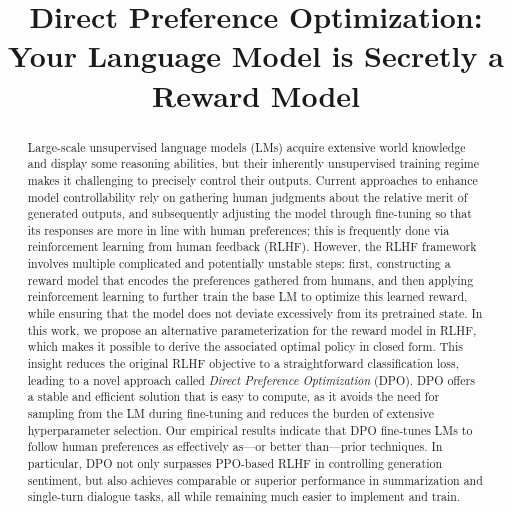 \title{Direct Preference Optimization: Your Language Model is Secretly a Reward Model}

\begin{abstract}
Large-scale unsupervised language models (LMs) acquire extensive world knowledge and display some reasoning abilities, but their inherently unsupervised training regime makes it challenging to precisely control their outputs. Current approaches to enhance model controllability rely on gathering human judgments about the relative merit of generated outputs, and subsequently adjusting the model through fine-tuning so that its responses are more in line with human preferences; this is frequently done via reinforcement learning from human feedback (RLHF). However, the RLHF framework involves multiple complicated and potentially unstable steps: first, constructing a reward model that encodes the preferences gathered from humans, and then applying reinforcement learning to further train the base LM to optimize this learned reward, while ensuring that the model does not deviate excessively from its pretrained state. In this work, we propose an alternative parameterization for the reward model in RLHF, which makes it possible to derive the associated optimal policy in closed form. This insight reduces the original RLHF objective to a straightforward classification loss, leading to a novel approach called \textit{Direct Preference Optimization} (DPO). DPO offers a stable and efficient solution that is easy to compute, as it avoids the need for sampling from the LM during fine-tuning and reduces the burden of extensive hyperparameter selection. Our empirical results indicate that DPO fine-tunes LMs to follow human preferences as effectively as—or better than—prior techniques. In particular, DPO not only surpasses PPO-based RLHF in controlling generation sentiment, but also achieves comparable or superior performance in summarization and single-turn dialogue tasks, all while remaining much easier to implement and train.
\end{abstract}

